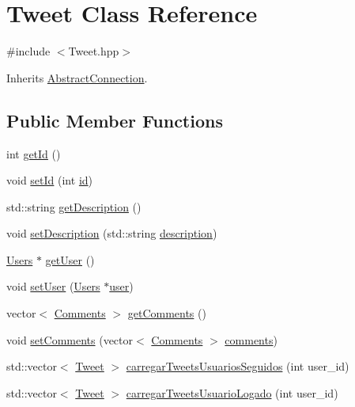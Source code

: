 \hypertarget{class_tweet}{}\section{Tweet Class Reference}
\label{class_tweet}


{\ttfamily \#include $<$Tweet.\+hpp$>$}



Inherits \hyperlink{class_abstract_connection}{Abstract\+Connection}.

\subsection*{Public Member Functions}
\begin{DoxyCompactItemize}
\item 
int \hyperlink{class_tweet_afe4722f5b4d276f36cef27989e9ecbc3}{get\+Id} ()
\item 
void \hyperlink{class_tweet_a646308cec056effe64ac5f81f5c00bfa}{set\+Id} (int \hyperlink{class_tweet_a3e7ab9402d5ed1126a432b266c2b9f22}{id})
\item 
std\+::string \hyperlink{class_tweet_a3e4e7abc45486860373cd3fa146f1366}{get\+Description} ()
\item 
void \hyperlink{class_tweet_a5555b6ad8543cfe17262bd6f3ef7e1a9}{set\+Description} (std\+::string \hyperlink{class_tweet_abc8726cb97ee5d2447dd30b35d52b9d1}{description})
\item 
\hyperlink{class_users}{Users} $\ast$ \hyperlink{class_tweet_a4f0bf8c0ac90793ba16049390052f18a}{get\+User} ()
\item 
void \hyperlink{class_tweet_a1c1483f00fccc2ca3f743b9224b09a76}{set\+User} (\hyperlink{class_users}{Users} $\ast$\hyperlink{class_tweet_a084d33216fa5d5a1e7dfe1a3e1730fdd}{user})
\item 
vector$<$ \hyperlink{class_comments}{Comments} $>$ \hyperlink{class_tweet_a72649ed74508f540d7b0a1a48fd5313c}{get\+Comments} ()
\item 
void \hyperlink{class_tweet_a3f110956ae50164f10f88bed321a4e59}{set\+Comments} (vector$<$ \hyperlink{class_comments}{Comments} $>$ \hyperlink{class_tweet_a710dd5d27fc8eb0e068e5dd334634d57}{comments})
\item 
std\+::vector$<$ \hyperlink{class_tweet}{Tweet} $>$ \hyperlink{class_tweet_a2e9a48b91eb50b1f69666dec18bedf07}{carregar\+Tweets\+Usuarios\+Seguidos} (int user\+\_\+id)
\item 
std\+::vector$<$ \hyperlink{class_tweet}{Tweet} $>$ \hyperlink{class_tweet_a258770cc789790c85903f2ed3a468e8a}{carregar\+Tweets\+Usuario\+Logado} (int user\+\_\+id)

\end{DoxyCompactItemize}
